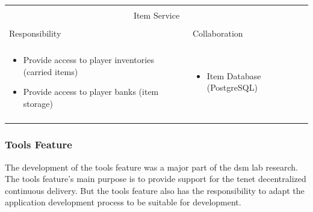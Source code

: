 \vspace{0.5cm} \noindent 
\begin{tabular}{|l|l|}
    \cline{1-2}
    \multicolumn{2}{|c|}{} \\[-0.3cm]
    \multicolumn{2}{|c|}{Item Service} \\ 
    \multicolumn{2}{|c|}{} \\[-0.3cm]
    \cline{1-2}
    Responsibility & Collaboration \\
    \cline{1-2}
    & \\[-0.2cm]
    \begin{minipage}{0.47\textwidth}
        \begin{itemize}
          \item Provide access to player inventories (carried items)
          \item Provide access to player banks (item storage)
        \end{itemize} 
    \end{minipage}
	&
    \begin{minipage}{0.47\textwidth}
        \begin{itemize}
          \item Item Database (PostgreSQL)
        \end{itemize} 
    \end{minipage}
	\\ & \\
    \hline
\end{tabular}

\newpage
\subsubsection{Tools Feature}

The development of the tools feature was a major part of the \gls{dsm} lab
research. The tools feature's main purpose is to provide support for the tenet
decentralized continuous delivery. But the tools feature also has the
responsibility to adapt the \ms{} application development process to be suitable
for \og{} development.\\

